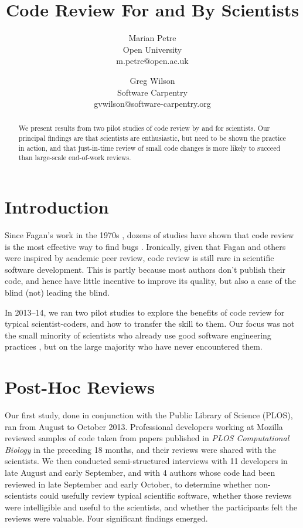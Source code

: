 \documentclass[10pt,twocolumn]{article}
\begin{document}
\title{Code Review For and By Scientists}
\author{
  Marian Petre \\ Open University \\ m.petre@open.ac.uk
  \and
  Greg Wilson \\ Software Carpentry \\ gvwilson@software-carpentry.org
}

\maketitle

\begin{abstract}

We present results from two pilot studies of code review by and for scientists.
Our principal findings are that scientists are enthusiastic,
but need to be shown the practice in action,
and that just-in-time review of small code changes is more likely to succeed
than large-scale end-of-work reviews.

\end{abstract}

\section{Introduction}

Since Fagan's work in the 1970s \cite{b:fagan1976,b:fagan1986},
dozens of studies have shown that code review is
the most effective way to find bugs \cite{b:cohen2010,b:bacchelli2013}.
Ironically,
given that Fagan and others were inspired by academic peer review,
code review is still rare in scientific software development.
This is partly because most authors don't publish their code,
and hence have little incentive to improve its quality,
but also a case of the blind (not) leading the blind.

In 2013--14,
we ran two pilot studies to explore the benefits of code review for typical scientist-coders,
and how to transfer the skill to them.
Our focus was not the small minority of scientists who already use good software engineering practices \cite{b:hannay2009},
but on the large majority who have never encountered them.

\section{Post-Hoc Reviews}

Our first study,
done in conjunction with the Public Library of Science (PLOS),
ran from August to October 2013.
Professional developers working at Mozilla reviewed samples of code
taken from papers published in \emph{PLOS Computational Biology} in the preceding 18 months,
and their reviews were shared with the scientists.
We then conducted semi-structured interviews \cite{b:rosenthal2007,b:bryman2008} with 11 developers in late August and early September,
and with 4 authors whose code had been reviewed in late September and early October,
to determine
whether non-scientists could usefully review typical scientific software,
whether those reviews were intelligible and useful to the scientists,
and whether the participants felt the reviews were valuable.
Four significant findings emerged.
\end{document}
